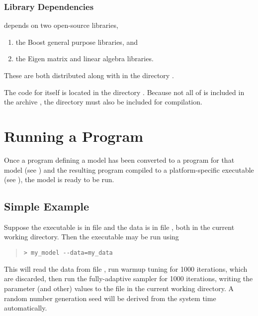 \subsection{Library Dependencies}

\Stan depends on two open-source libraries,
%
\begin{enumerate}
\item the Boost general purpose \Cpp libraries, and 
\item the Eigen matrix and linear algebra \Cpp libraries.
\end{enumerate}
%
These are both distributed along with \Stan in the directory
.  

The code for \Stan itself is located in the directory
.  Because not all of \Stan is included in the
archive , the  directory must also be
included for compilation.





\chapter{Running a \Stan Program}\label{stan-cmd.chapter}

\noindent 
Once a \Stan program defining a model has been converted to a \Cpp
program for that model (see ) and the resulting \Cpp
program compiled to a platform-specific executable (see
), the model is ready to be run.

\section{Simple Example}

Suppose the executable is in file  and the data
is in file , both in the current working directory.
Then the \Stan executable may be run using
%
\begin{quote}
\begin{Verbatim}[fontshape=sl]
> my_model --data=my_data
\end{Verbatim}
\end{quote}
%
This will read the data from file , run warmup tuning for
1000 iterations, which are discarded, then run the fully-adaptive
\NUTS sampler for 1000 iterations, writing the parameter (and other)
values to the file  in the current working
directory.  A random number generation seed will be derived from
the system time automatically.

